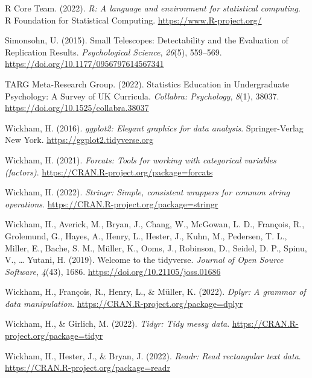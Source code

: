 \documentclass[
  man,floatsintext]{apa6}
\newlength{\cslhangindent}
\newlength{\cslentryspacingunit} %
\newenvironment{CSLReferences}[2] %
 {%
  \setlength{\parindent}{0pt}
  \ifodd #1
  \let\oldpar\par
  \def\par{\hangindent=\cslhangindent\oldpar}
  \fi
  \setlength{\parskip}{#2\cslentryspacingunit}
 }%
 {}
\begin{document}
\begin{CSLReferences}{1}{0}
\leavevmode{}%
R Core Team. (2022). \emph{R: A language and environment for statistical computing}. R Foundation for Statistical Computing. \url{https://www.R-project.org/}

\leavevmode{}%
Simonsohn, U. (2015). Small {Telescopes}: {Detectability} and the {Evaluation} of {Replication} {Results}. \emph{Psychological Science}, \emph{26}(5), 559--569. \url{https://doi.org/10.1177/0956797614567341}

\leavevmode{}%
TARG Meta-Research Group. (2022). Statistics {Education} in {Undergraduate} {Psychology}: {A} {Survey} of {UK} {Curricula}. \emph{Collabra: Psychology}, \emph{8}(1), 38037. \url{https://doi.org/10.1525/collabra.38037}

\leavevmode{}%
Wickham, H. (2016). \emph{ggplot2: Elegant graphics for data analysis}. Springer-Verlag New York. \url{https://ggplot2.tidyverse.org}

\leavevmode{}%
Wickham, H. (2021). \emph{Forcats: Tools for working with categorical variables (factors)}. \url{https://CRAN.R-project.org/package=forcats}

\leavevmode{}%
Wickham, H. (2022). \emph{Stringr: Simple, consistent wrappers for common string operations}. \url{https://CRAN.R-project.org/package=stringr}

\leavevmode{}%
Wickham, H., Averick, M., Bryan, J., Chang, W., McGowan, L. D., François, R., Grolemund, G., Hayes, A., Henry, L., Hester, J., Kuhn, M., Pedersen, T. L., Miller, E., Bache, S. M., Müller, K., Ooms, J., Robinson, D., Seidel, D. P., Spinu, V., \ldots{} Yutani, H. (2019). Welcome to the {tidyverse}. \emph{Journal of Open Source Software}, \emph{4}(43), 1686. \url{https://doi.org/10.21105/joss.01686}

\leavevmode{}%
Wickham, H., François, R., Henry, L., \& Müller, K. (2022). \emph{Dplyr: A grammar of data manipulation}. \url{https://CRAN.R-project.org/package=dplyr}

\leavevmode{}%
Wickham, H., \& Girlich, M. (2022). \emph{Tidyr: Tidy messy data}. \url{https://CRAN.R-project.org/package=tidyr}

\leavevmode{}%
Wickham, H., Hester, J., \& Bryan, J. (2022). \emph{Readr: Read rectangular text data}. \url{https://CRAN.R-project.org/package=readr}

\end{CSLReferences}
\end{document}
